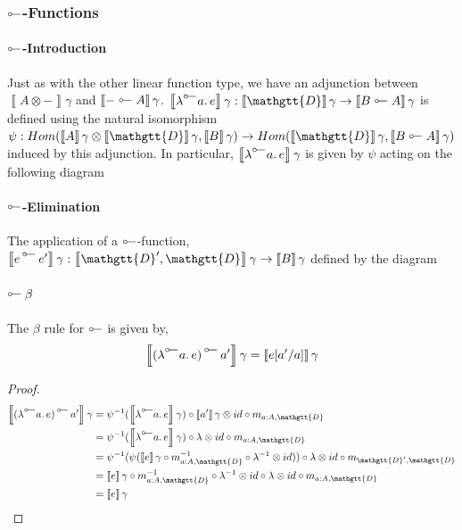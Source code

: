 \documentclass[acmsmall,nonacm]{acmart}
\renewcommand{\Delta}{\mathgtt{D}}
\newcommand{\sem}[1]{\left\llbracket{#1}\right\rrbracket}
\newcommand{\semg}[1]{\sem{#1}\gamma}
\newcommand{\lto}{\multimap}
\newcommand{\tol}{\mathrel{\rotatebox[origin=c]{180}{$\lto$}}}
\newcommand{\lambtol}[2]{\lambda^{{\tol}} #1.\, #2}
\newcommand{\apptol}[2]{#1 \mathop{{}^{\tol}} #2}
\begin{document}
{\subsubsection{$\tol$-Functions}
\paragraph{$\tol$-Introduction}
Just as with the other linear function type, we have an adjunction between
$\semg{A \otimes -}$ and $\semg{- \tol A}$. $\semg{\lambtol a e} : \semg{\Delta} \to \semg{B \tol A}$ is defined using the
natural isomorphism
$\psi : Hom(\semg{A} \otimes \semg{\Delta}, \semg{B}) \to Hom(\semg{\Delta}, \semg{B \tol A})$
induced by this adjunction. In particular, $\semg{\lambtol a e}$ is given by $\psi$
acting on the following diagram

\begin{center}
\end{center}

\paragraph{$\tol$-Elimination}
The application of a $\tol$-function,
$\semg{\apptol {e} {e'}} : \semg{\Delta',\Delta} \to \semg{B}$ defined by the diagram

\begin{center}
\end{center}

\paragraph{$\tol\beta$}
The $\beta$ rule for $\tol$ is given by,
\[
  \semg{\apptol {(\lambtol {a} {e})} {a'}} = \semg{e[a'/a]}
\]
\begin{proof}
\begin{align*}
  \semg{\apptol {(\lambtol {a} {e})} {a'}}
  & = \psi^{{-1}}(\semg{\lambtol {a} {e}}) \circ \semg{a'} \otimes id \circ m_{a:A,\Delta} \\
  & = \psi^{{-1}}(\semg{\lambtol {a} {e}}) \circ \lambda \otimes id \circ m_{a:A,\Delta} \\
  & = \psi^{{-1}}(\psi(\semg{e} \circ m^{-1}_{a:A,\Delta} \circ \lambda^{-1} \otimes id)) \circ \lambda \otimes id \circ m_{\Delta',\Delta} \\
  & = \semg{e} \circ m^{-1}_{a:A,\Delta} \circ \lambda^{-1} \otimes id \circ \lambda \otimes id \circ m_{a:A,\Delta} \\
  & = \semg{e}
\end{align*}


\end{proof}}
\end{document}
